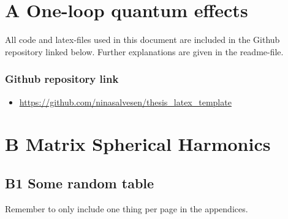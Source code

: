 

\chapter*{A \quad One-loop quantum effects}

All code and latex-files used in this document are included in the Github repository linked below. Further explanations are given in the readme-file. 


\subsection*{Github repository link}
\begin{itemize}
    \item \url{https://github.com/ninasalvesen/thesis_latex_template}
\end{itemize}




\chapter*{B \quad Matrix Spherical Harmonics}

\renewcommand{\thefigure}{B.\arabic{figure}}
\setcounter{figure}{0}
\renewcommand{\thetable}{B.\arabic{table}}
\setcounter{table}{0}


\section*{\large{B1 \quad Some random table}}
\vspace*{1cm}

Remember to only include one thing per page in the appendices.

